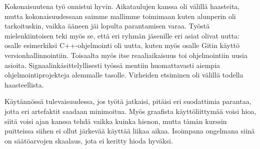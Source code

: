 \documentclass[11pt, a4paper, oneside]{article}
\begin{document}
Kokonaisuutena työ onnistui hyvin. 
Aikataulujen kanssa oli välillä haasteita, mutta kokonaisuudessaan saimme mallimme toimimaan kuten alunperin oli tarkoituskin, vaikka ääneen jäi lopulta parantamisen varaa.
Työstä mielenkiintoisen teki myös se, että eri ryhmän jäsenille eri asiat olivat uutta: osalle esimerkiksi C++-ohjelmointi oli uutta, kuten myös osalle Gitin käyttö versionhallinnointiin. 
Toisaalta myös itse reaaliaikaisuus toi ohjelmointiin uusia asioita. Signaalinkäsittelyllisesti työssä mentiin huomattavasti aiempia ohjelmointiprojekteja alemmalle tasolle. Virheiden etsiminen oli välillä todella haasteellista.

Käytännössä tulevaisuudessa, jos työtä jatkaisi, pitäisi eri suodattimia parantaa, jotta eri artefaktit saadaan minimoitua.
Myös graafista käyttöliittymää voisi hioa, siitä voisi ajan kanssa tehdä vaikka kuinka hienon, mutta tämän kurssin puitteissa siihen ei ollut järkevää käyttää liikaa aikaa. Isoimpana ongelmana siinä on säätöarvojen skaalaus, jota ei keritty hioda hyväksi.





\end{document}
